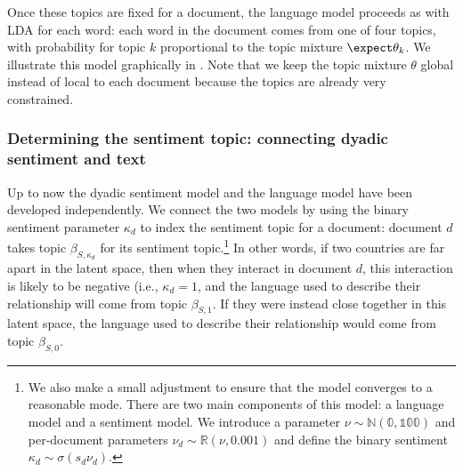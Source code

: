 Once these topics are fixed for a document, the language model
proceeds as with LDA for each word: each word in the document comes
from one of four topics, with probability for topic $k$ proportional
to the topic mixture $\expect \theta_k$.  We illustrate this model
graphically in .  Note that we
keep the topic mixture $\theta$ global instead of local to each
document because the topics are already very constrained.

\subsubsection{Determining the sentiment topic: connecting dyadic sentiment and text}

Up to now the dyadic sentiment model and the language model have been
developed independently.  We connect the two models by using the
binary sentiment parameter $\kappa_d$ to index the sentiment topic for
a document: document $d$ takes topic $\beta_{S,\kappa_d}$ for its
sentiment topic.\footnote{We also make a small adjustment to ensure
  that the model converges to a reasonable mode.  There are two main
  components of this model: a language model and a sentiment model. We
  introduce a parameter $\nu \sim \mathbb{N(0, 100)}$ and per-document
  parameters $\nu_d \sim \mathbb{R}(\nu, 0.001)$ and define the binary
  sentiment $\kappa_d \sim \sigma(s_d \nu_d)$.}
In other words, if two countries are far apart in the latent space,
then when they interact in document $d$, this interaction is likely to
be negative (i.e., $\kappa_d = 1$, and the language used to describe
their relationship will come from topic $\beta_{S, 1}$.  If they were
instead close together in this latent space, the language used to
describe their relationship would come from topic $\beta_{S, 0}$.

